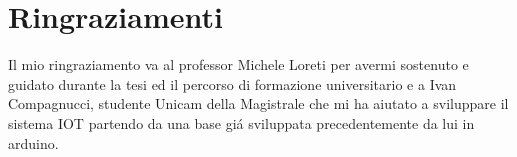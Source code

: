 \chapter*{Ringraziamenti}
Il mio ringraziamento va al professor Michele Loreti per avermi sostenuto e guidato durante la tesi ed il percorso di formazione universitario e a Ivan Compagnucci, studente Unicam della Magistrale che mi ha aiutato a sviluppare il sistema IOT partendo da una base gi\'a sviluppata precedentemente da lui in arduino. 